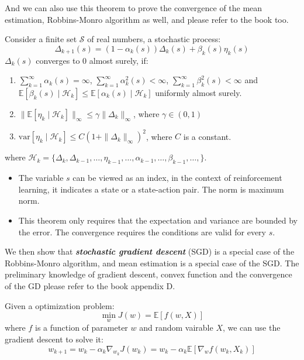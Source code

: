 \documentclass[10pt]{elegantbook}
\newcommand{\mydefination}[1]{\textbf{\textit{\textcolor{structurecolor}{#1}}}}
\begin{document}
And we can also use this theorem to prove the convergence of the mean estimation, Robbins-Monro algorithm as well, and please refer to the book too.

\begin{theorem}
    Consider a finite set $\mathcal S$ of real numbers, a stochastic process:
    \[ \Delta_{k+1}(s) = (1 - \alpha_k(s)) \Delta_k(s) + \beta_k(s) \eta_k(s) \]
    $\Delta_k(s)$ converges to 0 almost surely, if:
    \begin{enumerate}
        \item $\sum_{k=1}^{\infty} \alpha_k(s) = \infty$, $\sum_{k=1}^{\infty} \alpha_k^2(s) < \infty$, $\sum_{k=1}^{\infty} \beta_k^2(s) < \infty$ 
        and $\mathbb E[\beta_k(s) \mid \mathcal H_k] \leq \mathbb E[\alpha_k(s) \mid \mathcal H_k]$ uniformly almost surely.
        \item $\| \mathbb E[\eta_k \mid \mathcal H_k] \|_{\infty} \leq \gamma \| \Delta_k \|_{\infty}$, where $\gamma \in (0, 1)$
        \item $\text{var}[\eta_k \mid \mathcal H_k] \leq C (1 + \| \Delta_k \|_{\infty})^2$, where $C$ is a constant.
    \end{enumerate}
    where $\mathcal H_k = \{ \Delta_k, \Delta_{k-1}, \ldots, \eta_{k-1}, \ldots, \alpha_{k-1}, \ldots, \beta_{k-1}, \ldots, \}$.
    
    \begin{itemize}
        \item The variable $s$ can be viewed as an index, in the context of reinforcement learning, it indicates a state or a
state-action pair. The norm is maximum norm.
        \item This theorem only requires that the expectation and variance are bounded by the error. The convergence requires the conditions are valid for every $s$.
    \end{itemize}
\end{theorem}

We then show that \mydefination{stochastic gradient descent} (SGD) is a special case of the Robbins-Monro algorithm, and mean estimation is a special case 
of the SGD. The preliminary knowledge of gradient descent, convex function and the convergence of the GD please refer to the book appendix D. 

Given a optimization problem:
\[ \min_{w} J(w) = \mathbb E[f(w, X)] \]
where $f$ is a function of parameter $w$ and random vairable $X$, we can use the gradient descent to solve it:
\begin{equation}
    w_{k+1} = w_k - \alpha_k \nabla_{w_k} J(w_k) = w_k - \alpha_k \mathbb E[\nabla_{w} f(w_k, X_k)]
\end{equation}
\end{document}
